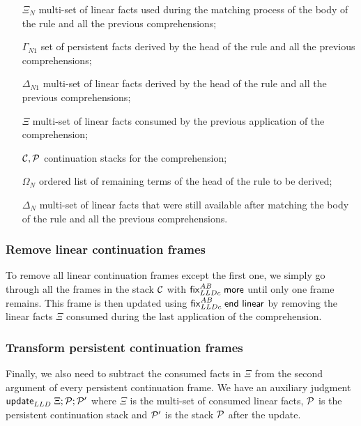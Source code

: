 \begin{enumerate}
   \item[$\Xi_N$] multi-set of linear facts used during the matching process of
   the body of the rule and all the previous comprehensions;
   \item[$\Gamma_{N1}$] set of persistent facts derived by the head of the rule
   and all the previous comprehensions;
   \item[$\Delta_{N1}$] multi-set of linear facts derived by the head of the
   rule and all the previous comprehensions;
   \item[$\Xi$] multi-set of linear facts consumed by the previous application
   of the comprehension;
   \item[$\mathcal{C}, \mathcal{P}$] continuation stacks for the comprehension;
   \item[$\Omega_N$] ordered list of remaining terms of the head of the rule to
   be derived;
   \item[$\Delta_N$] multi-set of linear facts that were still available after
   matching the body of the rule and all the previous comprehensions.
\end{enumerate}

\subsubsection{Remove linear continuation frames}

To remove all linear continuation frames except the first one, we simply go
through all the frames in the stack $\mathcal{C}$ with $\mathsf{fix}_{LLDc}^{AB} \; \mathsf{more}$
until only one frame remains. This frame is then updated using $\mathsf{fix}_{LLDc}^{AB} \; \mathsf{end~linear}$ by removing the linear facts $\Xi$ consumed
during the last application of the comprehension.



\subsubsection{Transform persistent continuation frames}

Finally, we also need to subtract the consumed facts in $\Xi$ from the second
argument of every persistent continuation frame.  We have an auxiliary judgment
$\mathsf{update}_{LLD} \; \Xi; \mathcal{P}; \mathcal{P'}$ where $\Xi$ is the multi-set of consumed
linear facts, $\mathcal{P}$ is the persistent continuation stack and
$\mathcal{P'}$ is the stack $\mathcal{P}$ after the update.



